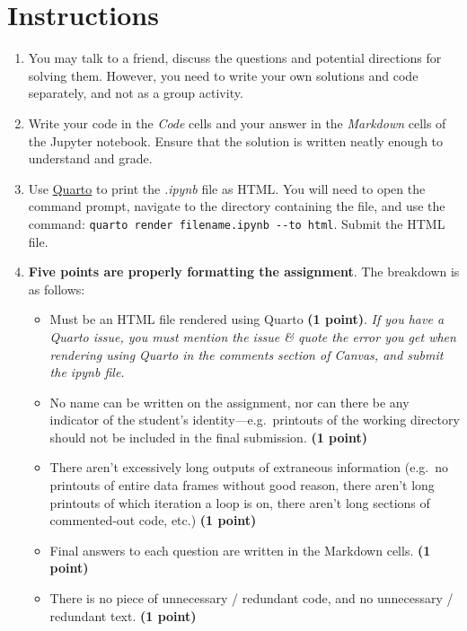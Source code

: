 \documentclass[
  letterpaper,
  DIV=11,
  numbers=noendperiod]{scrreprt}
\providecommand{\tightlist}{%
  \setlength{\itemsep}{0pt}\setlength{\parskip}{0pt}}\usepackage{longtable,booktabs,array}
\begin{document}
\section*{Instructions}\label{instructions-3}


\begin{enumerate}
\def\labelenumi{\arabic{enumi}.}
\item
  You may talk to a friend, discuss the questions and potential
  directions for solving them. However, you need to write your own
  solutions and code separately, and not as a group activity.
\item
  Write your code in the \emph{Code} cells and your answer in the
  \emph{Markdown} cells of the Jupyter notebook. Ensure that the
  solution is written neatly enough to understand and grade.
\item
  Use
  \href{https://quarto.org/docs/output-formats/html-basics.html}{Quarto}
  to print the \emph{.ipynb} file as HTML. You will need to open the
  command prompt, navigate to the directory containing the file, and use
  the command: \texttt{quarto\ render\ filename.ipynb\ -\/-to\ html}.
  Submit the HTML file.
\item
  \textbf{Five points are properly formatting the assignment}. The
  breakdown is as follows:

  \begin{itemize}
  \tightlist
  \item
    Must be an HTML file rendered using Quarto \textbf{(1 point)}.
    \emph{If you have a Quarto issue, you must mention the issue \&
    quote the error you get when rendering using Quarto in the comments
    section of Canvas, and submit the ipynb file.}
  \item
    No name can be written on the assignment, nor can there be any
    indicator of the student's identity---e.g.~printouts of the working
    directory should not be included in the final submission. \textbf{(1
    point)}
  \item
    There aren't excessively long outputs of extraneous information
    (e.g.~no printouts of entire data frames without good reason, there
    aren't long printouts of which iteration a loop is on, there aren't
    long sections of commented-out code, etc.) \textbf{(1 point)}
  \item
    Final answers to each question are written in the Markdown cells.
    \textbf{(1 point)}
  \item
    There is no piece of unnecessary / redundant code, and no
    unnecessary / redundant text. \textbf{(1 point)}
  \end{itemize}
\end{enumerate}
\end{document}
